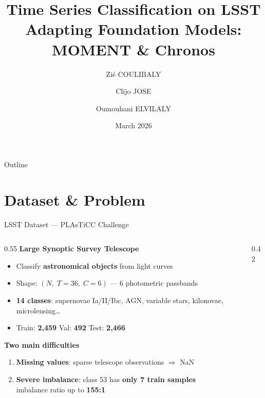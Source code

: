 \documentclass[aspectratio=169, 10pt]{beamer}
\title[LSST Classification — Foundation Models]{%
  \textbf{Time Series Classification on LSST}\\[0.3em]
  \normalsize Adapting Foundation Models: MOMENT \& Chronos
}
\author{Zié COULIBALY \and Clijo JOSE \and Oumouhani ELVILALY}
\institute{}
\date{March 2026}
\begin{document}

\begin{frame}
  \titlepage
\end{frame}

\begin{frame}{Outline}
  \tableofcontents
\end{frame}

\section{Dataset \& Problem}

\begin{frame}{LSST Dataset — PLAsTiCC Challenge}
  \begin{columns}
    \begin{column}{0.55\textwidth}
      \textbf{Large Synoptic Survey Telescope}
      \begin{itemize}
        \item Classify \textbf{astronomical objects} from light curves
        \item Shape: $(N,\; T{=}36,\; C{=}6)$ — 6 photometric passbands
        \item \textbf{14 classes}: supernovae Ia/II/Ibc, AGN, variable stars,
              kilonovae, microlensing\ldots
        \item Train: \textbf{2,459} \quad Val: \textbf{492} \quad Test: \textbf{2,466}
      \end{itemize}
      \vspace{0.4em}
      \textbf{Two main difficulties}
      \begin{enumerate}
        \item \textbf{Missing values}: sparse telescope observations $\Rightarrow$ NaN
        \item \textbf{Severe imbalance}: class 53 has \textbf{only 7 train samples}\\
              imbalance ratio up to \textbf{155:1}
      \end{enumerate}
    \end{column}
    \begin{column}{0.42\textwidth}
      \begin{center}
      \footnotesize
      \begin{tabular}{lrr}
        \toprule

\end{tabular}
\end{center}
\end{column}
\end{columns}
\end{frame}
\end{document}
